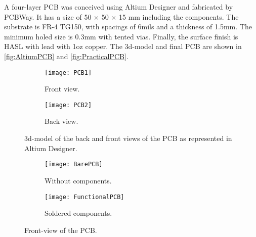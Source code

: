 A four-layer PCB was conceived using Altium Designer and fabricated by PCBWay. It has a size of 50 $\times$ 50 $\times$ 15 mm including the components. The substrate is FR-4 TG150, with spacings of 6mils and a thickness of 1.5mm. The minimum holed size is 0.3mm with tented vias. Finally, the surface finish is HASL with lead with 1oz copper. The 3d-model and final PCB are shown in \autoref{fig:AltiumPCB} and \autoref{fig:PracticalPCB}. 
\begin{figure}[h]
\centering
\begin{subfigure}{0.49\textwidth}
\centering
    \texttt{[image: PCB1]}
    \caption{Front view.}
    \label{fig:PCB1}
\end{subfigure}
\begin{subfigure}{0.49\textwidth}
\centering
    \texttt{[image: PCB2]}
    \caption{Back view.}
    \label{fig:PCB2}
\end{subfigure}
\caption{3d-model of the back and front views of the PCB as represented in Altium Designer.}
\label{fig:AltiumPCB}
\end{figure}
\begin{figure}[h]
\centering
\begin{subfigure}{0.49\textwidth}
\centering
    \texttt{[image: BarePCB]}
    \caption{Without components.}
    \label{fig:BarePCB}
\end{subfigure}
\begin{subfigure}{0.49\textwidth}
\centering
    \texttt{[image: FunctionalPCB]}
    \caption{Soldered components.}
    \label{fig:FunctionalPCB}
\end{subfigure}
\caption{Front-view of the PCB.}
\label{fig:PracticalPCB}
\end{figure}